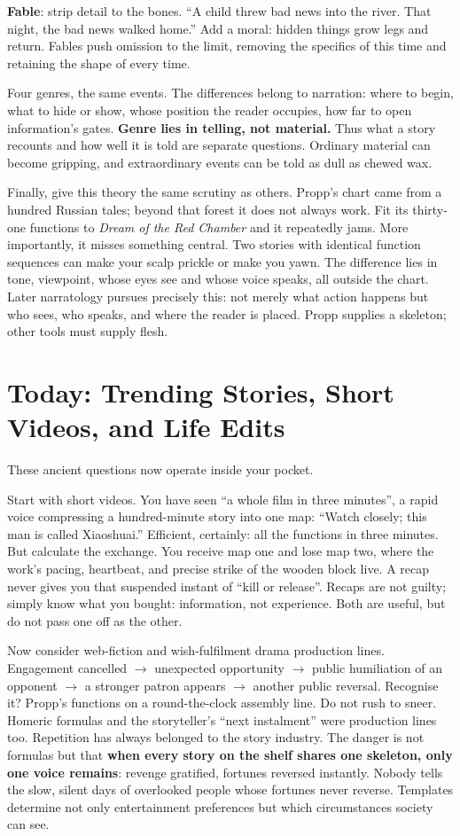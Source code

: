 \textbf{Fable}: strip detail to the bones. ``A child threw bad news into the river. That night, the bad news walked home.'' Add a moral: hidden things grow legs and return. Fables push omission to the limit, removing the specifics of this time and retaining the shape of every time.

Four genres, the same events. The differences belong to narration: where to begin, what to hide or show, whose position the reader occupies, how far to open information's gates. \textbf{Genre lies in telling, not material.} Thus what a story recounts and how well it is told are separate questions. Ordinary material can become gripping, and extraordinary events can be told as dull as chewed wax.

Finally, give this theory the same scrutiny as others. Propp's chart came from a hundred Russian tales; beyond that forest it does not always work. Fit its thirty-one functions to \emph{Dream of the Red Chamber} and it repeatedly jams. More importantly, it misses something central. Two stories with identical function sequences can make your scalp prickle or make you yawn. The difference lies in tone, viewpoint, whose eyes see and whose voice speaks, all outside the chart. Later narratology pursues precisely this: not merely what action happens but who sees, who speaks, and where the reader is placed. Propp supplies a skeleton; other tools must supply flesh.

\section[Trending Stories and Life Edits]{Today: Trending Stories, Short Videos, and Life Edits}
These ancient questions now operate inside your pocket.

Start with short videos. You have seen ``a whole film in three minutes'', a rapid voice compressing a hundred-minute story into one map: ``Watch closely; this man is called Xiaoshuai.'' Efficient, certainly: all the functions in three minutes. But calculate the exchange. You receive map one and lose map two, where the work's pacing, heartbeat, and precise strike of the wooden block live. A recap never gives you that suspended instant of ``kill or release''. Recaps are not guilty; simply know what you bought: information, not experience. Both are useful, but do not pass one off as the other.

Now consider web-fiction and wish-fulfilment drama production lines. Engagement cancelled $\rightarrow$ unexpected opportunity $\rightarrow$ public humiliation of an opponent $\rightarrow$ a stronger patron appears $\rightarrow$ another public reversal. Recognise it? Propp's functions on a round-the-clock assembly line. Do not rush to sneer. Homeric formulas and the storyteller's ``next instalment'' were production lines too. Repetition has always belonged to the story industry. The danger is not formulas but that \textbf{when every story on the shelf shares one skeleton, only one voice remains}: revenge gratified, fortunes reversed instantly. Nobody tells the slow, silent days of overlooked people whose fortunes never reverse. Templates determine not only entertainment preferences but which circumstances society can see.

